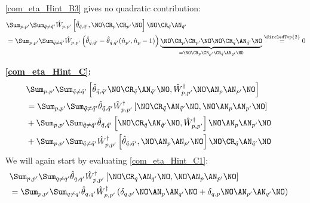 \begin{appendix}
\begin{itemize}
\ref{com_eta_Hint_B3} gives no quadratic contribution:
\begin{align}
&\Sum_{p, p^\prime}\Sum_{\tilde q\neq\tilde q^\prime} \hat W_{p,p^\prime}\left[\hat\theta_{\tilde q,\tilde q^\prime},\NO\CR_p\CR_{p^\prime}\NO\right]\NO\CR_{\tilde q}\AN_{\tilde q^\prime}\nonumber\\ 
&=\Sum_{p, p^\prime}\Sum_{\tilde q\neq\tilde q^\prime} \hat W_{p,p^\prime}\left(\hat\theta_{\tilde q,\tilde q^\prime}-\hat\theta_{\tilde q,\tilde q^\prime}(\hat n_{p^\prime},\hat n_p-1)\right)\underbrace{\NO\CR_p\CR_{p^\prime}\NO\NO\CR_{\tilde q}\AN_{\tilde q^\prime}\NO}_{=\NO\CR_p\CR_{p^\prime}\CR_{\tilde q}\AN_{\tilde q^\prime}\NO} \overset{\CircledTop{2}}{=} 0
\end{align}
\item[\textbf{\ref{com_eta_Hint_C}:}]
\begin{subequations}
\begin{align}
& \Sum_{p, p^\prime}\Sum_{\tilde q\neq\tilde q^\prime} \left[\hat\theta_{\tilde q,\tilde q^\prime}\NO\CR_{\tilde q}\AN_{\tilde q^\prime}\NO,\hat W_{p,p^\prime}^\dagger\NO\AN_p\AN_{p^\prime}\NO\right] \nonumber\\
&=\Sum_{p, p^\prime}\Sum_{\tilde q\neq\tilde q^\prime} \hat\theta_{\tilde q,\tilde q^\prime}\hat W_{p,p^\prime}^\dagger\left[\NO\CR_{\tilde q}\AN_{\tilde q^\prime}\NO,\NO\AN_p\AN_{p^\prime}\NO\right]\label{com_eta_Hint_C1}\\
&+\Sum_{p, p^\prime}\Sum_{\tilde q\neq\tilde q^\prime}\hat\theta_{\tilde q,\tilde q^\prime}\left[\NO\CR_{\tilde q}\AN_{\tilde q^\prime}\NO,\hat W_{p,p^\prime}^\dagger\right]\NO\AN_p\AN_{p^\prime}\NO\label{com_eta_Hint_C2}\\
&+\Sum_{p, p^\prime}\Sum_{\tilde q\neq\tilde q^\prime}\hat W_{p,p^\prime}^\dagger \left[\hat\theta_{\tilde q,\tilde q^\prime},\NO\AN_p\AN_{p^\prime}\NO\right]\NO\CR_{\tilde q}\AN_{\tilde q^\prime}\NO\label{com_eta_Hint_C3}
\end{align}
\end{subequations}
We will again start by evaluating \ref{com_eta_Hint_C1}:
\begin{align}
&\Sum_{p, p^\prime}\Sum_{ q\neq q^\prime} \hat\theta_{ q, q^\prime}\hat W_{p,p^\prime}^\dagger\left[\NO\CR_{ q}\AN_{ q^\prime}\NO,\NO\AN_p\AN_{p^\prime}\NO\right]\nonumber\\
&=\Sum_{p, p^\prime}\Sum_{ q\neq q^\prime} \hat\theta_{ q, q^\prime}\hat W_{p,p^\prime}^\dagger\left(\delta_{q,p^\prime}\NO\AN_p\AN_{q^\prime}\NO+\delta_{q,p}\NO\AN_{p^\prime}\AN_{q^\prime}\NO\right)\nonumber\\

\end{align}
\end{itemize}
\end{appendix}
